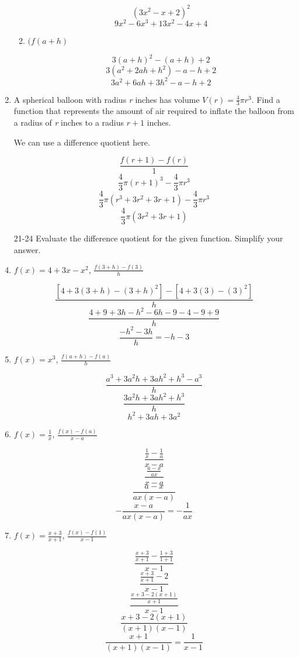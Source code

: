 \documentclass{article}
\begin{document}
\begin{enumerate}
\begin{enumerate}
					$$ (3x^2 - x + 2)^2$$
					$$9x^2 - 6x^3 + 13x^2 - 4x + 4$$
					
				\item $(f(a + h)$
					
					$$3(a + h)^2 - (a + h) + 2 $$
					$$3(a^2 + 2ah + h^2) - a - h + 2 $$
					$$3a^2 + 6ah + 3h^2 - a - h + 2 $$
			\end{enumerate}
			
			\item A spherical balloon with radius \emph{r} inches has volume $V(r) = \frac{4}{3}\pi  r^3$.
				Find a function that represents the amount of air required to inflate the balloon from a
				radius of \emph{r} inches to a radius $r + 1$ inches.
				
				We can use a difference quotient here.
				
				$$\frac{f(r + 1) - f(r)}{1}$$
				$$\frac{4}{3}\pi (r + 1)^3 - \frac{4}{3}\pi r^3$$
				$$\frac{4}{3}\pi (r^3 + 3r^2 + 3r + 1) - \frac{4}{3} \pi r^3$$
				$$\frac{4}{3} \pi (3r^2 + 3r + 1) $$
				
			\item[21-24] Evaluate the difference quotient for the given function. Simplify your answer.
			
		
			\item $f(x) = 4 + 3x - x^2$, $\frac{f(3 + h) - f(3)}{h}$

				$$\frac{[4 + 3(3 + h) - (3 + h)^2] - [4 + 3(3) - (3)^2]}{h}$$
				$$\frac{4 + 9 + 3h - h^2 - 6h - 9 - 4 - 9 + 9}{h}$$
				$$\frac{-h^2 - 3h}{h} = - h - 3$$

			\item $f(x) = x^3$, $\frac{f(a+h) - f(a)}{h}$

				$$\frac{a^3 + 3a^2h + 3ah^2 + h^3 - a^3}{h}$$
				$$\frac{3a^2h + 3ah^2 + h^3}{h}$$
				$$h^2 + 3ah + 3a^2$$

			\item $f(x) = \frac{1}{x}$, $\frac{f(x) - f(a)}{x - a}$

				$$\frac{\frac{1}{x}- \frac{1}{a}}{x-a}$$
				$$\frac{\frac{a-x}{ax}}{x - a}$$
				$$\frac{a - x}{ax(x-a)}$$
				$$-\frac{x-a}{ax(x - a)} = - \frac{1}{ax}$$

			\item $f(x) = \frac{x + 3}{x + 1}$, $\frac{f(x) - f(1)}{x - 1}$

				$$ \frac{ \frac{x + 3}{x + 1} - \frac{1 + 3}{1 + 1}}{x - 1} $$
				$$ \frac{ \frac{x + 3}{x +1} - 2}{x-1} $$
				$$ \frac{ \frac{x + 3 - 2(x + 1)}{x + 1}}{x - 1} $$
				$$ \frac{x + 3 - 2(x + 1)}{(x + 1)(x - 1)} $$
				$$ \frac{x + 1}{(x + 1)(x - 1)} = \frac{1}{x - 1} $$


\end{enumerate}
\end{document}
